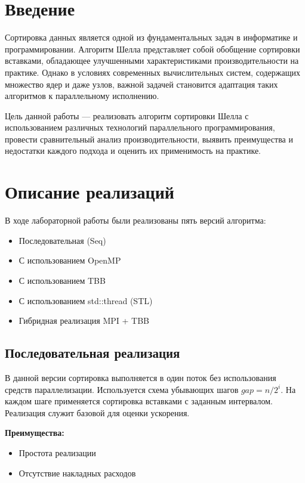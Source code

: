 \documentclass[a4paper,12pt]{article}
\begin{document}
\tableofcontents
\newpage

\section*{Введение}

Сортировка данных является одной из фундаментальных задач в информатике и программировании. Алгоритм Шелла представляет собой обобщение сортировки вставками, обладающее улучшенными характеристиками производительности на практике. Однако в условиях современных вычислительных систем, содержащих множество ядер и даже узлов, важной задачей становится адаптация таких алгоритмов к параллельному исполнению.

Цель данной работы — реализовать алгоритм сортировки Шелла с использованием различных технологий параллельного программирования, провести сравнительный анализ производительности, выявить преимущества и недостатки каждого подхода и оценить их применимость на практике.

\newpage

\section{Описание реализаций}

В ходе лабораторной работы были реализованы пять версий алгоритма:

\begin{itemize}
  \item Последовательная (Seq)
  \item С использованием OpenMP
  \item С использованием TBB
  \item С использованием std::thread (STL)
  \item Гибридная реализация MPI + TBB
\end{itemize}

\subsection*{Последовательная реализация}

В данной версии сортировка выполняется в один поток без использования средств параллелизации. Используется схема убывающих шагов $gap = n / 2^i$. На каждом шаге применяется сортировка вставками с заданным интервалом. Реализация служит базовой для оценки ускорения.

\textbf{Преимущества:}
\begin{itemize}
  \item Простота реализации
  \item Отсутствие накладных расходов
\end{itemize}
\end{document}
